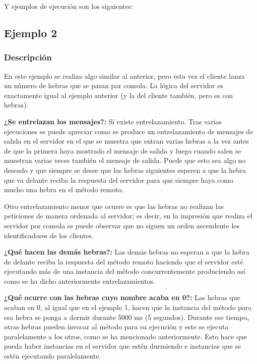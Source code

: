 \documentclass{article}
\begin{document}
Y ejemplos de ejecución son los siguientes:



\subsection{Ejemplo 2}
\subsubsection{Descripción}
En este ejemplo se realiza algo similar al anterior, pero esta vez el cliente lanza un número de hebras que se pasan por consola. La lógica del servidor es exactamente igual al ejemplo anterior (y la del cliente también, pero es con hebras).

\textbf{¿Se entrelazan los mensajes?: }Sí existe entrelazamiento. Tras varias ejecuciones se puede apreciar como se produce un entrelazamiento de mensajes de salida en el servidor en el que se muestra que entran varias hebras a la vez antes de que la primera haya mostrado el mensaje de salida y luego cuando salen se muestran varias veces también el mensaje de salida. Puede que esto sea algo no deseado y que siempre se desee que las hebras siguientes esperen a que la hebra que va delante reciba la respuesta del servidor para que siempre haya como mucho una hebra en el método remoto.


Otro entrelazamiento menor que ocurre es que las hebras no realizan las peticiones de manera ordenada al servidor; es decir, en la impresión que realiza el servidor por consola se puede observar que no siguen un orden ascendente los identificadores de los clientes.

\textbf{¿Qué hacen las demás hebras?: }Las demás hebras no esperan a que la hebra de delante reciba la respuesta del método remoto haciendo que el servidor esté ejecutando más de una instancia del método concurrentemente produciendo así como se ha dicho anteriormente entrelazamientos.  



\textbf{¿Qué ocurre con las hebras cuyo nombre acaba en 0?: }Las hebras que acaban en 0, al igual que en el ejemplo 1, hacen que la instancia del método para esa hebra se ponga a dormir durante 5000 ms (5 segundos). Durante ese tiempo, otras hebras pueden invocar al método para su ejecución y este se ejecuta paralelamente a los otros, como se ha mencionado anteriormente. Esto hace que pueda haber instancias en el servidor que estén durmiendo e instancias que se estén ejecutando paralelamente.
\end{document}
